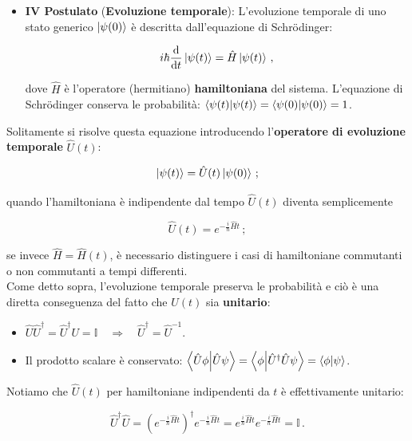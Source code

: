\begin{itemize}
    \item \textbf{IV Postulato} (\textbf{Evoluzione temporale}): L'evoluzione temporale di uno stato generico $\ket{\psi(0)}$ è descritta dall'equazione di Schrödinger:
    
    \begin{equation*}
        i \hbar \dv{t} \ket{\psi(t)} = \hat H \ket{\psi(t)} \, ,
    \end{equation*}
    
    \noindent dove $\hat{H}$ è l'operatore (hermitiano) \textbf{hamiltoniana} del sistema. L'equazione di Schrödinger conserva le probabilità: $\braket{\psi(t)} = \braket{\psi(0)} = 1$. 
\end{itemize}

\noindent Solitamente si risolve questa equazione introducendo l'\textbf{operatore di evoluzione temporale} $\hat{U}(t)$:

\begin{equation*}
    \ket{\psi(t)} = \hat{U}(t) \ket{\psi(0)} \, ;
\end{equation*}

\noindent quando l'hamiltoniana è indipendente dal tempo $\hat{U}(t)$ diventa semplicemente

\begin{equation*}
    \hat{U} (t) = e^{-\frac{i}{\hbar} \hat H t} \, ;
\end{equation*}

\noindent se invece $\hat H = \hat H(t)$, è necessario distinguere i casi di hamiltoniane commutanti o non commutanti a tempi differenti.\\
\noindent Come detto sopra, l'evoluzione temporale preserva le probabilità e ciò è una diretta conseguenza del fatto che $\hat{U}(t)$ sia \textbf{unitario}: 
\begin{itemize}
    \item $\hat U \hat U^\dagger = \hat U^\dagger U = \mathbb{I} \quad \Rightarrow \quad \hat{U}^\dagger = \hat{U}^{-1}$.
    \item Il prodotto scalare è conservato: $\braket{\hat U\phi}{\hat U\psi} = \braket{\phi}{\hat U^\dagger \hat U\psi} = \braket{\phi}{\psi}$. 
\end{itemize}
\noindent Notiamo che $\hat{U}(t)$ per hamiltoniane indipendenti da $t$ è effettivamente unitario:

\begin{equation*}
    \hat U^\dagger \hat U = \left( e^{-\frac{i}{\hbar} \hat H t} \right)^\dagger e^{-\frac{i}{\hbar} \hat H t} = e^{\frac{i}{\hbar} \hat H t} e^{-\frac{i}{\hbar} \hat H t} = \mathbb{I} \, .
\end{equation*}

